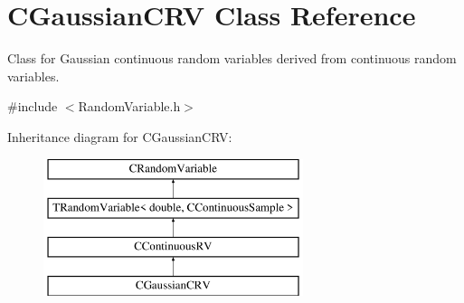 \hypertarget{class_c_gaussian_c_r_v}{\section{C\-Gaussian\-C\-R\-V Class Reference}
\label{class_c_gaussian_c_r_v}
}


Class for Gaussian continuous random variables derived from continuous random variables.  




{\ttfamily \#include $<$Random\-Variable.\-h$>$}

Inheritance diagram for C\-Gaussian\-C\-R\-V\-:\begin{figure}[H]
\begin{center}
\leavevmode
\includegraphics[height=4.000000cm]{class_c_gaussian_c_r_v}
\end{center}
\end{figure}
